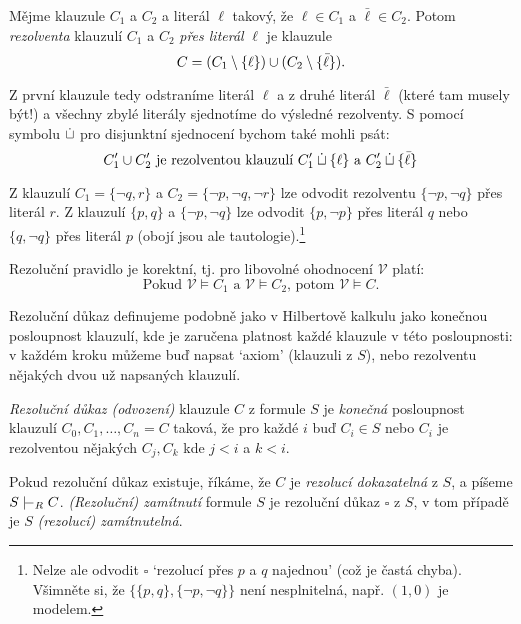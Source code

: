 \begin{definition}
    Mějme klauzule $C_1$ a $C_2$ a literál $\ell$ takový, že $\ell\in C_1$ a $\bar\ell\in C_2$. Potom \emph{rezolventa} klauzulí $C_1$ a $C_2$ \emph{přes literál} $\ell$ je klauzule
    $$
    C=(C_1\setminus\{\ell\})\mathbin{\cup} (C_2\setminus\{\bar\ell\}).
    $$
\end{definition}

Z první klauzule tedy odstraníme literál $\ell$ a z druhé literál $\bar\ell$ (které tam musely být!) a všechny zbylé literály sjednotíme do výsledné rezolventy. S pomocí symbolu $\mathbin{\dot{\sqcup}}$ pro disjunktní sjednocení bychom také mohli psát:
$$
C_1'\mathbin{\cup} C_2'\text{ je rezolventou klauzulí }C_1'\mathbin{\dot{\sqcup}}\{\ell\}\text{ a }C_2'\mathbin{\dot{\sqcup}}\{\bar \ell\}
$$

\begin{example}
    Z klauzulí $C_1=\{\neg q,r\}$ a $C_2=\{\neg p,\neg q,\neg r\}$ lze odvodit rezolventu  $\{\neg p,\neg q\}$ přes literál $r$. Z klauzulí $\{p,q\}$ a $\{\neg p,\neg q\}$ lze odvodit $\{p,\neg p\}$ přes literál $q$ nebo $\{q,\neg q\}$ přes literál $p$ (obojí jsou ale tautologie).\footnote{Nelze ale odvodit $\square$ `rezolucí přes $p$ a $q$ najednou' (což je častá chyba). Všimněte si, že $\{\{p,q\},\{\neg p,\neg q\}\}$ není nesplnitelná, např. $(1,0)$ je modelem.}
\end{example}

\begin{observation}
Rezoluční pravidlo je korektní, tj. pro libovolné ohodnocení $\mathcal V$ platí:
$$
\text{Pokud }\mathcal V\models C_1\text{ a }\mathcal V\models C_2\text{, potom }\mathcal V\models C.
$$
\end{observation}

Rezoluční důkaz definujeme podobně jako v Hilbertově kalkulu jako konečnou posloupnost klauzulí, kde je zaručena platnost každé klauzule v této posloupnosti: v každém kroku můžeme buď napsat `axiom' (klauzuli z $S$), nebo rezolventu nějakých dvou už napsaných klauzulí.

\begin{definition}
    \emph{Rezoluční důkaz (odvození)} klauzule $C$ z formule $S$ je \emph{konečná} posloupnost klauzulí $C_0,C_1,\dots,C_n=C$
    taková, že pro každé $i$ buď $C_i\in S$ nebo $C_i$ je rezolventou nějakých $C_j,C_k$ kde $j<i$ a $k<i$.

    Pokud rezoluční důkaz existuje, říkáme, že $C$ je \emph{rezolucí dokazatelná} z $S$, a píšeme $S\proves_R C$. \emph{(Rezoluční) zamítnutí} formule $S$ je rezoluční důkaz $\square$ z $S$, v tom případě je $S$ \emph{(rezolucí) zamítnutelná}.
\end{definition}

